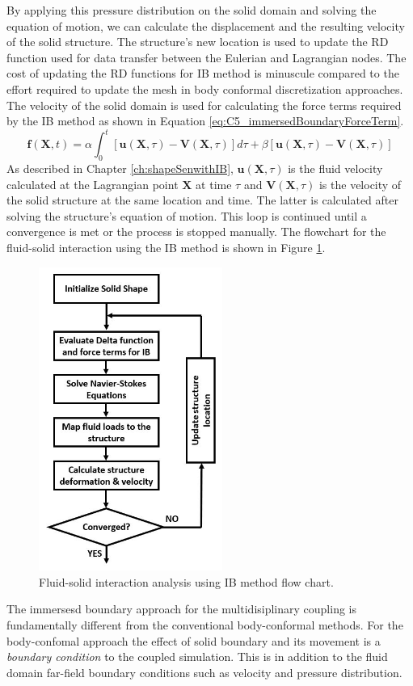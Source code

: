 By applying this pressure distribution on the solid domain and solving the equation of motion, we can calculate the displacement and the resulting velocity of the solid structure. The structure's new location is used to update the RD function used for data transfer between the Eulerian and Lagrangian nodes. The cost of updating the RD functions for IB method is minuscule compared to the effort required to update the mesh in body conformal discretization approaches. The velocity of the solid domain is used for calculating the force terms required by the IB method as shown in Equation \eqref{eq:C5_immersedBoundaryForceTerm}.
%
\begin{equation}\label{eq:C5_immersedBoundaryForceTerm}
    \mathbf{f}(\mathbf{X}, t) = 
    \alpha \int_0^t \left[ \mathbf{u}(\mathbf{X}, \tau) - \mathbf{V}(\mathbf{X}, \tau) \right] d\tau + 
    \beta \left[ \mathbf{u}(\mathbf{X}, \tau) - \mathbf{V}(\mathbf{X}, \tau) \right]
\end{equation}
%
As described in Chapter \ref{ch:shapeSenwithIB}, $\mathbf{u}(\mathbf{X}, \tau)$ is the fluid velocity calculated at the Lagrangian point $\mathbf{X}$ at time $\tau$ and $\mathbf{V}(\mathbf{X}, \tau)$ is the velocity of the solid structure at the same location and time. The latter is calculated after solving the structure's equation of motion. This loop is continued until a convergence is met or the process is stopped manually. The flowchart for the fluid-solid interaction using the IB method is shown in Figure \ref{fig:C5_FSIflowchart}.
%
\begin{figure}[H]
    \centering
    \includegraphics[width=6.00cm]{Chapter_5/figure/Chapter5_FSI_FlowChart.jpg}
    \caption{Fluid-solid interaction analysis using IB method flow chart.}
    \label{fig:C5_FSIflowchart}
\end{figure}
%
The immersesd boundary approach for the multidisiplinary coupling is fundamentally different from the conventional body-conformal methods. For the body-confomal approach the effect of solid boundary and its movement is a \emph{boundary condition} to the coupled simulation. This is in addition to the fluid domain  far-field boundary conditions such as velocity and pressure distribution.

